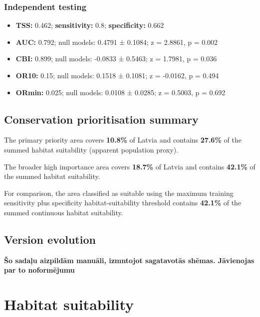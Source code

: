 \documentclass[
  openany]{book}
\providecommand{\tightlist}{%
  \setlength{\itemsep}{0pt}\setlength{\parskip}{0pt}}
\providecommand{\tightlist}{%
  \setlength{\itemsep}{0pt}%
  \setlength{\parskip}{0pt}%
}
\begin{document}
\subsubsection*{Independent testing}\label{independent-testing-3}

\begin{itemize}
\tightlist
\item
  \textbf{TSS:} 0.462; \textbf{sensitivity:} 0.8; \textbf{specificity:} 0.662
\item
  \textbf{AUC:} 0.792; null models: 0.4791 ± 0.1084; z = 2.8861, p = 0.002
\item
  \textbf{CBI:} 0.899; null models: -0.0833 ± 0.5463; z = 1.7981, p = 0.036
\item
  \textbf{OR10:} 0.15; null models: 0.1518 ± 0.1081; z = -0.0162, p = 0.494
\item
  \textbf{ORmin:} 0.025; null models: 0.0108 ± 0.0285; z = 0.5003, p = 0.692
\end{itemize}

\subsection*{Conservation prioritisation summary}\label{conservation-prioritisation-summary-3}

The primary priority area covers \textbf{10.8\%} of Latvia and contains \textbf{27.6\%} of the summed habitat suitability (apparent population proxy).

The broader high importance area covers \textbf{18.7\%} of Latvia and contains \textbf{42.1\%} of the summed habitat suitability.

For comparison, the area classified as suitable using the maximum training sensitivity plus specificity habitat-suitability threshold contains \textbf{42.1\%} of the summed continuous habitat suitability.

\subsection*{Version evolution}\label{version-evolution-3}

\textbf{Šo sadaļu aizpildām manuāli, izmntojot sagatavotās shēmas. Jāvienojas par to noformējumu}

\section*{Habitat suitability}\label{habitat-suitability-3}
\end{document}
